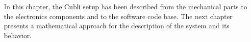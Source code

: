 In this chapter, the Cubli setup has been described from the mechanical parts to the electronics components and to the software code base.
The next chapter presents a mathematical approach for the description of the system and its behavior.